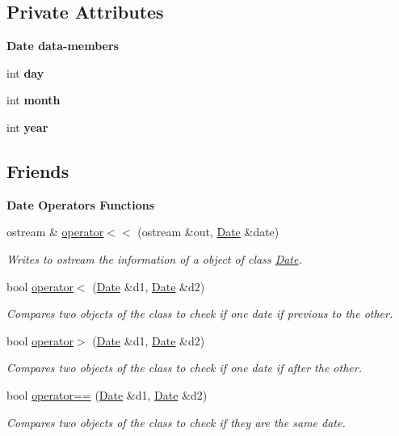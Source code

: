 \subsection*{Private Attributes}
\begin{Indent}\textbf{ Date data-\/members}\par
\begin{DoxyCompactItemize}
\item 
int {\bfseries day}
\item 
int {\bfseries month}
\item 
int {\bfseries year}
\end{DoxyCompactItemize}
\end{Indent}
\subsection*{Friends}
\begin{Indent}\textbf{ Date Operators Functions}\par
\begin{DoxyCompactItemize}
\item 
ostream \& \hyperlink{group___date_ga277b4ff7a5bea855f71b2b7f941fbc2f}{operator$<$$<$} (ostream \&out, \hyperlink{class_date}{Date} \&date)
\begin{DoxyCompactList}\small\item\em Writes to ostream the information of a object of class \hyperlink{class_date}{Date}. \end{DoxyCompactList}\item 
bool \hyperlink{group___date_ga532ae38442ee586783b532725767634a}{operator$<$} (\hyperlink{class_date}{Date} \&d1, \hyperlink{class_date}{Date} \&d2)
\begin{DoxyCompactList}\small\item\em Compares two objects of the class to check if one date if previous to the other. \end{DoxyCompactList}\item 
bool \hyperlink{group___date_ga3d72003c210f3adc692715148aa7cf26}{operator$>$} (\hyperlink{class_date}{Date} \&d1, \hyperlink{class_date}{Date} \&d2)
\begin{DoxyCompactList}\small\item\em Compares two objects of the class to check if one date if after the other. \end{DoxyCompactList}\item 
bool \hyperlink{group___date_gaa932959bdd56052bc683d29b8748898f}{operator==} (\hyperlink{class_date}{Date} \&d1, \hyperlink{class_date}{Date} \&d2)
\begin{DoxyCompactList}\small\item\em Compares two objects of the class to check if they are the same date. \end{DoxyCompactList}\end{DoxyCompactItemize}
\end{Indent}


